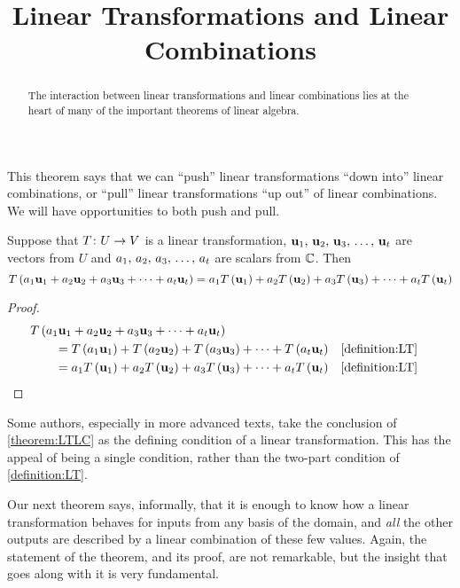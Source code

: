 \documentclass{ximera}
\title{Linear Transformations and Linear Combinations}
\begin{document}
\begin{abstract}
The interaction between linear transformations and linear combinations lies at the heart of many of the important theorems of linear algebra.
\end{abstract}
\maketitle

This theorem says that we can ``push'' linear transformations ``down into'' linear combinations, or ``pull'' linear transformations ``up out'' of linear combinations.  We will have opportunities to both push and pull.

\begin{theorem}
\label{theorem:LTLC}

Suppose that $T\colon U\rightarrow V$ is a linear transformation, $\mathbf{u}_{1},\,\mathbf{u}_{2},\,\mathbf{u}_{3},\,\ldots,\,\mathbf{u}_{t}$ are vectors from $U$ and ${a}_{1},\,{a}_{2},\,{a}_{3},\,\ldots,\,{a}_{t}$ are scalars from $\mathbb{C}$.  Then
\[
T\left(a_{1}\mathbf{u}_{1}+a_{2}\mathbf{u}_{2}+a_{3}\mathbf{u}_{3}+\cdots +a_{t}\mathbf{u}_{t}\right)
=
a_1T\left(\mathbf{u}_1\right)+
a_2T\left(\mathbf{u}_2\right)+
a_3T\left(\mathbf{u}_3\right)+\cdots+
a_tT\left(\mathbf{u}_t\right)
\]

\begin{proof}

\begin{align*}
&T\left(a_{1}\mathbf{u}_{1}+a_{2}\mathbf{u}_{2}+a_{3}\mathbf{u}_{3}+\cdots +a_{t}\mathbf{u}_{t}\right)\\
&\quad\quad=
T\left(a_1\mathbf{u}_1\right)+
T\left(a_2\mathbf{u}_2\right)+
T\left(a_3\mathbf{u}_3\right)+\cdots+
T\left(a_t\mathbf{u}_t\right)&&\ref{definition:LT}\\
&\quad\quad=
a_1T\left(\mathbf{u}_1\right)+
a_2T\left(\mathbf{u}_2\right)+
a_3T\left(\mathbf{u}_3\right)+\cdots+
a_tT\left(\mathbf{u}_t\right)&&\ref{definition:LT}
\end{align*}

\end{proof}
\end{theorem}

Some authors, especially in more advanced texts, take the conclusion of \ref{theorem:LTLC} as the defining condition of a linear transformation.  This has the appeal of being a single condition, rather than the two-part condition of \ref{definition:LT}.

Our next theorem says, informally, that it is enough to know how a linear transformation behaves for inputs from any basis of the domain, and \textit{all} the other outputs are described by a linear combination of these few values.  Again, the statement of the theorem, and its proof, are not remarkable, but the insight that goes along with it is very fundamental.
\end{document}
